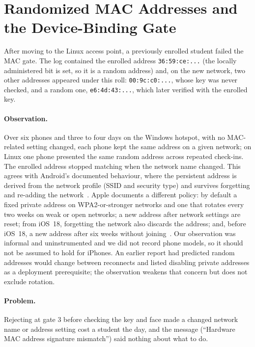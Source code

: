 \documentclass[11pt,a4paper]{article}
\newcommand{\code}[1]{\texttt{#1}}
\begin{document}
\section{Randomized MAC Addresses and the Device-Binding Gate}\label{sec:mac}
After moving to the Linux access point, a previously enrolled student failed the MAC gate. The log contained the enrolled address \code{36:59:ce:...} (the locally administered bit is set, so it is a random address) and, on the new network, two other addresses appeared under this roll: \code{00:9c:c0:...}, whose key was never checked, and a random one, \code{e6:4d:43:...}, which later verified with the enrolled key.

\paragraph{Observation.} Over six phones and three to four days on the Windows hotspot, with no MAC-related setting changed, each phone kept the same address on a given network; on Linux one phone presented the same random address across repeated check-ins. The enrolled address stopped matching when the network name changed. This agrees with Android's documented behaviour, where the persistent address is derived from the network profile (SSID and security type) and survives forgetting and re-adding the network~\cite{androidmac}. Apple documents a different policy: by default a fixed private address on WPA2-or-stronger networks and one that rotates every two weeks on weak or open networks; a new address after network settings are reset; from iOS~18, forgetting the network also discards the address; and, before iOS~18, a new address after six weeks without joining~\cite{applemac}. Our observation was informal and uninstrumented and we did not record phone models, so it should not be assumed to hold for iPhones. An earlier report had predicted random addresses would change between reconnects and listed disabling private addresses as a deployment prerequisite; the observation weakens that concern but does not exclude rotation.

\paragraph{Problem.} Rejecting at gate 3 before checking the key and face made a changed network name or address setting cost a student the day, and the message (``Hardware MAC address signature mismatch'') said nothing about what to do.
\end{document}

